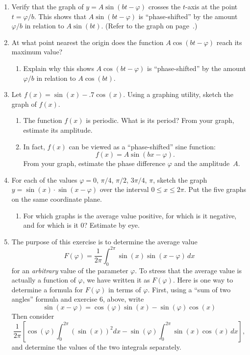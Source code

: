 \begin{enumerate}
\item Verify that the graph of $y = A\sin(bt - \varphi)$ crosses the
$t$-axis at the point $t = \varphi/b$.  This shows that $A\sin(bt -
\varphi)$ is ``phase-shifted'' by the amount $\varphi/b$ in relation
to $A\sin(bt)$.  (Refer to the graph on page~\pageref{phase graph}.)


\item At what point nearest the origin does the function $A\cos(bt -
\varphi)$ reach its maximum value?

  \begin{enumerate}
  \item Explain why this shows $A\cos(bt - \varphi)$ is ``phase-shifted''
by the amount $\varphi/b$ in relation to $A\cos(bt)$.



\end{enumerate}
\item Let $f(x) = \sin(x) - .7\cos(x)$. Using a graphing utility,
sketch the graph of $f(x)$.

  \begin{enumerate}
  \item The function $f(x)$ is periodic.  What is its period?  From your
graph, estimate its amplitude.

  \item In fact, $f(x)$ can be viewed as a ``phase-shifted'' sine
function:
	\[
f(x) = A\sin(bx - \varphi).
\]
From your graph, estimate the phase difference $\varphi$ and the
amplitude~$A$.



\end{enumerate}
\item For each of the values $\varphi = 0$, $\pi/4$, $\pi/2$,
$3\pi/4$, $\pi$, sketch the graph $y = \sin(x) \cdot \sin(x -
\varphi)$ over the interval $0 \leq x \leq 2\pi$.  Put the five graphs
on the same coordinate plane.

  \begin{enumerate}
  \item For which graphs is the average value positive, for which is it
negative, and for which is it 0?  Estimate by eye.


\end{enumerate}
\item The purpose of this exercise is to determine the average value
	\[
F(\varphi) = \dfrac{1}{2\pi} \int_0^{2\pi} \sin(x)\sin(x - \varphi)\,dx
\]
for an {\em arbitrary\/} value of the parameter $\varphi$.  To stress
that the average value is actually a function of $\varphi$, we have
written it as $F(\varphi)$.  Here is one way to determine a formula
for $F(\varphi)$ in terms of $\varphi$.  First, using a ``sum of two
angles'' formula and exercise 6, above, write
	\[
\sin(x - \varphi) = \cos(\varphi)\sin(x) - \sin(\varphi)\cos(x)
\] 
Then consider
	\[
\dfrac{1}{2\pi} \left[\cos(\varphi)\int_0^{2\pi} (\sin(x))^2 dx -
		\sin(\varphi)\int_0^{2\pi} \sin(x)\cos(x) \, dx \right],
\]
and determine the values of the two integrals separately.  



\end{enumerate}
